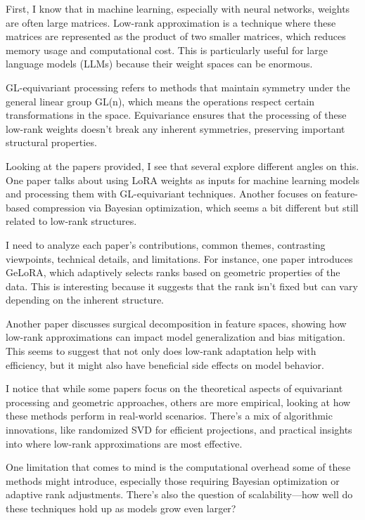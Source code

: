 \documentclass[conference]{IEEEtran}
\begin{document}
First, I know that in machine learning, especially with neural networks, weights are often large matrices. Low-rank approximation is a technique where these matrices are represented as the product of two smaller matrices, which reduces memory usage and computational cost. This is particularly useful for large language models (LLMs) because their weight spaces can be enormous.

GL-equivariant processing refers to methods that maintain symmetry under the general linear group GL(n), which means the operations respect certain transformations in the space. Equivariance ensures that the processing of these low-rank weights doesn't break any inherent symmetries, preserving important structural properties.

Looking at the papers provided, I see that several explore different angles on this. One paper talks about using LoRA weights as inputs for machine learning models and processing them with GL-equivariant techniques. Another focuses on feature-based compression via Bayesian optimization, which seems a bit different but still related to low-rank structures.

I need to analyze each paper's contributions, common themes, contrasting viewpoints, technical details, and limitations. For instance, one paper introduces GeLoRA, which adaptively selects ranks based on geometric properties of the data. This is interesting because it suggests that the rank isn't fixed but can vary depending on the inherent structure.

Another paper discusses surgical decomposition in feature spaces, showing how low-rank approximations can impact model generalization and bias mitigation. This seems to suggest that not only does low-rank adaptation help with efficiency, but it might also have beneficial side effects on model behavior.

I notice that while some papers focus on the theoretical aspects of equivariant processing and geometric approaches, others are more empirical, looking at how these methods perform in real-world scenarios. There's a mix of algorithmic innovations, like randomized SVD for efficient projections, and practical insights into where low-rank approximations are most effective.

One limitation that comes to mind is the computational overhead some of these methods might introduce, especially those requiring Bayesian optimization or adaptive rank adjustments. There’s also the question of scalability—how well do these techniques hold up as models grow even larger?
\end{document}
